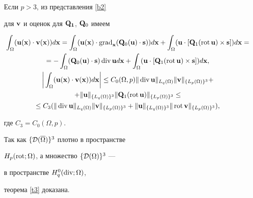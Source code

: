 Если $p>3$, из представления \ref{b2}


для $\bold{v}$ и оценок для $\bold{Q_1}$, $\bold{Q}_0$ имеем


\begin{gather*}


\int_{\Omega}(\bold{u}(\bold{x})\cdot\bold{v}(\bold{x}))d\bold{x}=


\int_{\Omega}(\bold{u}(\bold{x})\cdot\Grad_{\bold{x}}(\bold{Q}_0


(\bold{u})\cdot\bold{s}))d\bold{x}+\int_{\Omega}


(\bold{u}\cdot[\bold{Q}_1(\Rot\bold{u})\times\bold{s}])d\bold{x}=\\


%


=-\int_{\Omega}(\bold{Q}_0(\bold{u})\cdot\bold{s})


\Div\bold{u}d\bold{x}+\int_{\Omega}


(\bold{u}\cdot[\bold{Q}_1(\Rot\bold{u})\times\bold{s}])d\bold{x},\\


%


\bigg|\int_{\Omega}(\bold{u}(\bold{x})\cdot\bold{v}(\bold{x}))d\bold{x}\bigg|\leq


C_0(\Omega,p)\|\Div\bold{u}\|_{L_q(\Omega)}\|\bold{v}\|_


{\{L_p(\Omega)\}^3}+\\


%


+\|\bold{u}\|_{\{L_q(\Omega)\}^3}\|\bold{Q}_1(\Rot\bold{u})\|_


{\{L_p(\Omega)\}^3}\leq \\


%


\leq C_3(\|\Div\bold{u}\|_{L_q(\Omega)}\|\bold{v}\|_


{\{L_p(\Omega)\}^3}+\|\bold{u}\|_{\{L_q(\Omega)\}^3}\|\Rot\bold{v}\|_


{\{L_p(\Omega)\}^3}),


\end{gather*}


где $C_3=C_0(\Omega,p)$.





Так как $\{{\cal D}(\overline{\Omega})\}^3$ плотно в пространстве


$H_p(\operatorname{rot};\Omega)$, а множество $\{{\cal D}(\Omega)\}^3$ ---


в пространстве $H_q^0(\operatorname{div};\Omega)$,


теорема \ref{t3} доказана.


